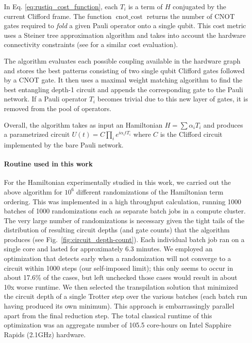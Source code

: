 \documentclass[
  reprint,            %
  amsmath,amssymb,
  aps,
  superscriptaddress, %
  longbibliography
]{revtex4-2}
\theoremstyle{definition}
\begin{document}
In Eq. \ref{eq:rustiq_cost_function}, each $T_i$ is a term of $H$ conjugated by the current Clifford frame. The function $\operatorname{cnot\_cost}$ returns the number of CNOT gates required to \emph{fold} a given Pauli operator onto a single qubit. This cost metric uses a Steiner tree approximation algorithm and takes into account the hardware connectivity constraints (see \cite{Martiel_2022} for a similar cost evaluation).

The algorithm evaluates each possible coupling available in the hardware graph and stores the best patterns consisting of two single qubit Clifford gates followed by a CNOT gate. It then uses a maximal weight matching algorithm to find the best entangling depth-1 circuit and appends the corresponding gate to the Pauli network. If a Pauli operator $T_i$ becomes trivial due to this new layer of gates, it is removed from the pool of operators.

Overall, the algorithm takes as input an Hamiltonian $H = \sum \alpha_i T_i$ and produces a parametrized circuit ${U(t) = C\prod_i e^{i\alpha_it T_i}}$ where $C$ is the Clifford circuit implemented by the bare Pauli network.

\paragraph{Routine used in this work}

For the Hamiltonian experimentally studied in this work, we carried out the above algorithm for $10^6$ different randomizations of the Hamiltonian term ordering. This was implemented in a high throughput calculation, running 1000 batches of 1000 randomizations each as separate batch jobs in a compute cluster. The very large number of randomizations is necessary given the tight tails of the distribution of resulting circuit depths (and gate counts) that the algorithm produces (see Fig.~\ref{fig:circuit_depth-count}). Each individual batch job ran on a single core and lasted for approximately $6.3$ minutes. We employed an optimization that detects early when a randomization will not converge to a circuit within 1000 steps (our self-imposed limit); this only seems to occur in about 17.6\% of the cases, but left unchecked those cases would result in about 10x worse runtime. We then selected the transpilation solution that minimized the circuit depth of a single Trotter step over the various batches (each batch run having produced its own minimum). This approach is embarrassingly parallel apart from the final reduction step. The total classical runtime of this optimization was an aggregate number of 105.5 core-hours on Intel Sapphire Rapids (2.1GHz) hardware.
\end{document}

